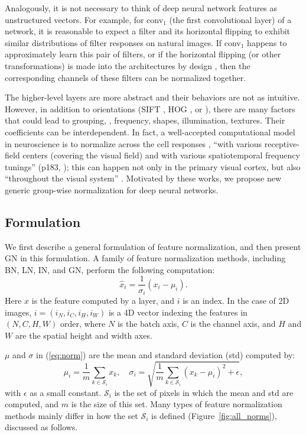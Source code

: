 \documentclass[10pt,twocolumn,letterpaper]{article}
\begin{document}
Analogously, it is not necessary to think of deep neural network features as unstructured vectors. For example, for conv$_1$ (the first convolutional layer) of a network, it is reasonable to expect a filter and its horizontal flipping to exhibit similar distributions of filter responses on natural images. If conv$_1$ happens to approximately learn this pair of filters, or if the horizontal flipping (or other transformations) is made into the architectures by design \cite{Dieleman2016,Cohen2016}, then the corresponding channels of these filters can be normalized together.

The higher-level layers are more abstract and their behaviors are not as intuitive. However, in addition to orientations (SIFT \cite{Lowe2004}, HOG \cite{Dalal2005}, or \cite{Dieleman2016,Cohen2016}), there are many factors that could lead to grouping, \eg, frequency, shapes, illumination, textures. Their coefficients can be interdependent.
In fact, a well-accepted computational model in neuroscience is to normalize across the cell responses \cite{Heeger1992,Schwartz2001,Simoncelli2001,Carandini2012}, ``with various receptive-field centers (covering the visual field) and with various spatiotemporal frequency tunings'' (p183, \cite{Heeger1992}); this can happen not only  in the primary visual cortex, but also ``throughout the visual system'' \cite{Carandini2012}.
Motivated by these works, we propose new generic group-wise normalization for deep neural networks.

\subsection{Formulation}

We first describe a general formulation of feature normalization, and then present GN in this formulation.
A family of feature normalization methods, including BN, LN, IN, and GN,
perform the following computation:
\begin{equation}\label{eq:norm}
\hat{x}_i = \frac{1}{\sigma_i}(x_i - \mu_i).
\end{equation}
Here $x$ is the feature computed by a layer, and $i$ is an index. In the case of 2D images, $i=(i_N, i_C, i_H, i_W)$ is a 4D vector indexing the features in $(N, C, H, W)$ order, where $N$ is the batch axis, $C$ is the channel axis, and $H$ and $W$ are the spatial height and width axes.

$\mu$ and $\sigma$ in (\ref{eq:norm}) are the mean and standard deviation (std) computed by:
\begin{equation}\label{eq:mu_sigma}
\mu_i = \frac{1}{m}\sum_{k\in \mathcal{S}_i} x_k, \quad \sigma_i = \sqrt{ \frac{1}{m}\sum_{k\in \mathcal{S}_i} (x_k-\mu_i)^2 + \epsilon},
\end{equation}
with $\epsilon$ as a small constant. $\mathcal{S}_i$ is the set of pixels in which the mean and std are computed, and $m$ is the size of this set. Many types of feature normalization methods mainly differ in how the set $\mathcal{S}_i$ is defined (Figure~\ref{fig:all_norms}), discussed as follows.
\end{document}
